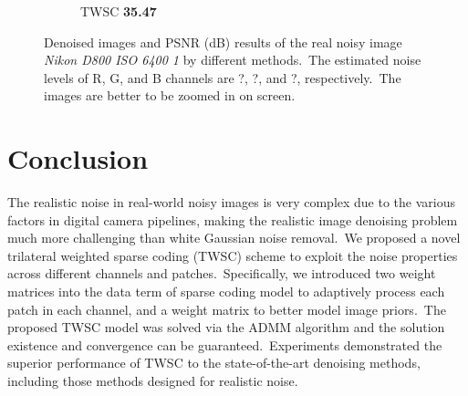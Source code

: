 \begin{figure}
\begin{subfigure}[t]{0.19\textwidth}
		\caption{TWSC \textbf{35.47}}
    \end{subfigure}
    \caption{Denoised images and PSNR (dB) results of the real noisy image \textsl{Nikon D800 ISO 6400 1} \cite{crosschannel2016} by different methods.\ The estimated noise levels of R, G, and B channels are ?, ?, and ?, respectively.\ The images are better to be zoomed in on screen.}
    \label{fig5-15}
\end{figure}



\section{Conclusion}

The realistic noise in real-world noisy images is very complex due to the various factors in digital camera pipelines, making the realistic image denoising problem much more challenging than white Gaussian noise removal.\ We proposed a novel trilateral weighted sparse coding (TWSC) scheme to exploit the noise properties across different channels and patches.\ Specifically, we introduced two weight matrices into the data term of sparse coding model to adaptively process each patch in each channel, and a weight matrix to better model image priors.\ The proposed TWSC model was solved via the ADMM algorithm and the solution existence and convergence can be guaranteed.\ Experiments demonstrated the superior performance of TWSC to the state-of-the-art denoising methods, including those methods designed for realistic noise.